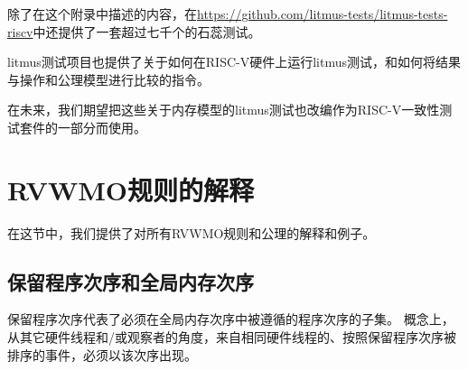 除了在这个附录中描述的内容，在\url{https://github.com/litmus-tests/litmus-tests-riscv}中还提供了一套超过七千个的石蕊测试。

\begin{commentary}
  litmus测试项目也提供了关于如何在RISC-V硬件上运行litmus测试，和如何将结果与操作和公理模型进行比较的指令。
\end{commentary}

\begin{commentary}
  在未来，我们期望把这些关于内存模型的litmus测试也改编作为RISC-V一致性测试套件的一部分而使用。
\end{commentary}

\section{RVWMO规则的解释}
在这节中，我们提供了对所有RVWMO规则和公理的解释和例子。

\subsection{保留程序次序和全局内存次序}
保留程序次序代表了必须在全局内存次序中被遵循的程序次序的子集。
概念上，从其它硬件线程和/或观察者的角度，来自相同硬件线程的、按照保留程序次序被排序的事件，必须以该次序出现。


